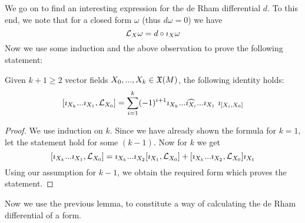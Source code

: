 We go on to find an interesting expression for the de Rham differential $d$. To this end, we note that for a closed form $\omega$ (thus $d\omega = 0$) we have
$$ \mathcal{L}_{X} \omega = d \circ \imath_X \omega $$
Now we use some induction and the above observation to prove the following statement:

\begin{lem}
  Given $k+1 \geq 2$ vector fields $X_0,...,X_{k} \in \mathfrak{X}(M)$, the following identity holds:
  $$ [\imath_{X_k} ... \imath_{X_1}, \mathcal{L}_{X_0}]  = \sum_{i=1}^{k} (-1)^{i+1} \imath_{X_k} ... \widehat{\imath_{X_i}} ... \imath_{X_1} \ \imath_{[X_i, X_0]}$$
  \begin{proof}
    We use induction on $k$. Since we have already shown the formula for $k = 1$, let the statement hold for some $(k-1)$. Now for $k$ we get
    $$ [\imath_{X_k} ... \imath_{X_1}, \mathcal{L}_{X_0}] = \imath_{X_k} ... \imath_{X_2} [\imath_{X_1}, \mathcal{L}_{X_0}] + [\imath_{X_k} ... \imath_{X_2}, \mathcal{L}_{X_0}] \imath_{X_1}$$
    Using our assumption for $k-1$, we obtain the required form which proves the statement.
  \end{proof}
\end{lem}

Now we use the previous lemma, to constitute a way of calculating the de Rham differential of a form.

